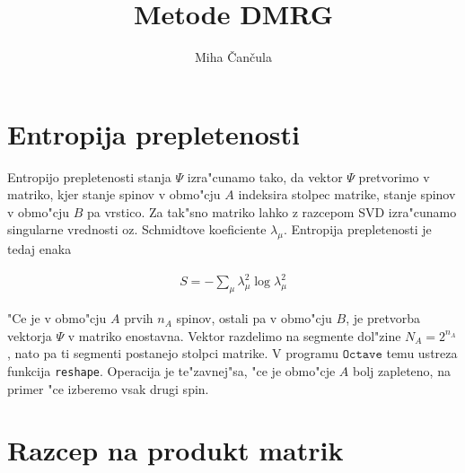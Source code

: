 \documentclass[a4paper,10pt]{article}
\title{Metode \textsc{DMRG}}
\author{Miha \v Can\v cula}
\begin{document}
\maketitle

\section{Entropija prepletenosti}

Entropijo prepletenosti stanja $\Psi$ izra"cunamo tako, da vektor $\Psi$ pretvorimo v matriko, kjer stanje spinov v obmo"cju $A$ indeksira stolpec matrike, stanje spinov v obmo"cju $B$ pa vrstico. Za tak"sno matriko lahko z razcepom \textsc{SVD} izra"cunamo singularne vrednosti oz. Schmidtove koeficiente $\lambda_\mu$. Entropija prepletenosti je tedaj enaka

\begin{align}
 S = -\sum_\mu \lambda_\mu^2 \log \lambda_\mu^2
\end{align}

"Ce je v obmo"cju $A$ prvih $n_A$ spinov, ostali pa v obmo"cju $B$, je pretvorba vektorja $\Psi$ v matriko enostavna. Vektor razdelimo na segmente dol"zine $N_A = 2^{n_A}$, nato pa ti segmenti postanejo stolpci matrike. V programu $\texttt{Octave}$ temu ustreza funkcija \texttt{reshape}. Operacija je te"zavnej"sa, "ce je obmo"cje $A$ bolj zapleteno, na primer "ce izberemo vsak drugi spin. 

\section{Razcep na produkt matrik}
\end{document}
